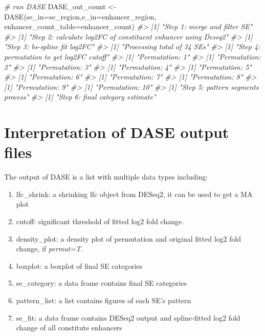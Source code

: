 \documentclass[
]{article}
\newenvironment{Shaded}{\begin{snugshade}}{\end{snugshade}}
\newcommand{\AttributeTok}[1]{\textcolor[rgb]{0.77,0.63,0.00}{#1}}
\newcommand{\CommentTok}[1]{\textcolor[rgb]{0.56,0.35,0.01}{\textit{#1}}}
\newcommand{\FunctionTok}[1]{\textcolor[rgb]{0.00,0.00,0.00}{#1}}
\newcommand{\NormalTok}[1]{#1}
\newcommand{\OtherTok}[1]{\textcolor[rgb]{0.56,0.35,0.01}{#1}}
\providecommand{\tightlist}{%
  \setlength{\itemsep}{0pt}\setlength{\parskip}{0pt}}
\begin{document}
\begin{Shaded}
\begin{Highlighting}[]
\CommentTok{\# run DASE}
\NormalTok{DASE\_out\_count }\OtherTok{\textless{}{-}} \FunctionTok{DASE}\NormalTok{(}\AttributeTok{se\_in=}\NormalTok{se\_region,}\AttributeTok{e\_in=}\NormalTok{enhancer\_region,}
                 \AttributeTok{enhancer\_count\_table=}\NormalTok{enhancer\_count)}
\CommentTok{\#\textgreater{} [1] "Step 1: merge and filter SE"}
\CommentTok{\#\textgreater{} [1] "Step 2: calculate log2FC of constituent enhancer using Deseq2"}
\CommentTok{\#\textgreater{} [1] "Step 3: bs{-}spline fit log2FC"}
\CommentTok{\#\textgreater{} [1] "Processing total of 34 SEs"}
\CommentTok{\#\textgreater{} [1] "Step 4: permutation to get log2FC cutoff"}
\CommentTok{\#\textgreater{} [1] "Permutation: 1"}
\CommentTok{\#\textgreater{} [1] "Permutation: 2"}
\CommentTok{\#\textgreater{} [1] "Permutation: 3"}
\CommentTok{\#\textgreater{} [1] "Permutation: 4"}
\CommentTok{\#\textgreater{} [1] "Permutation: 5"}
\CommentTok{\#\textgreater{} [1] "Permutation: 6"}
\CommentTok{\#\textgreater{} [1] "Permutation: 7"}
\CommentTok{\#\textgreater{} [1] "Permutation: 8"}
\CommentTok{\#\textgreater{} [1] "Permutation: 9"}
\CommentTok{\#\textgreater{} [1] "Permutation: 10"}
\CommentTok{\#\textgreater{} [1] "Step 5: pattern segments process"}
\CommentTok{\#\textgreater{} [1] "Step 6: final category estimate"}
\end{Highlighting}
\end{Shaded}

\hypertarget{interpretation-of-dase-output-files}{%
\section{Interpretation of DASE output
files}\label{interpretation-of-dase-output-files}}

The output of DASE is a list with multiple data types including:

\begin{enumerate}
\def\labelenumi{\arabic{enumi}.}
\tightlist
\item
  lfc\_shrink: a shrinking lfc object from DESeq2, it can be used to get
  a MA plot
\item
  cutoff: significant threshold of fitted log2 fold change.
\item
  density\_plot: a density plot of permutation and original fitted log2
  fold change, if \emph{permut=T}.
\item
  boxplot: a boxplot of final SE categories
\item
  se\_category: a data frame contains final SE categories
\item
  pattern\_list: a list contains figures of each SE's pattern
\item
  se\_fit: a data frame contains DESeq2 output and spline-fitted log2
  fold change of all constitute enhancers
\end{enumerate}
\end{document}
